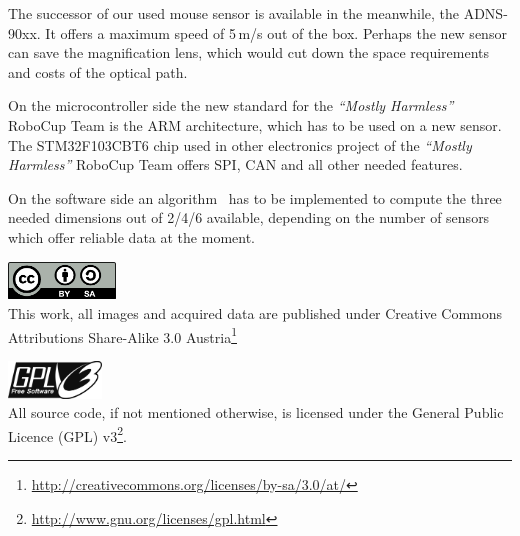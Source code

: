 \documentclass[12pt,a4paper]{article}
\newcommand{\MH}{\emph{``Mostly Harmless''} RoboCup Team\xspace}
\begin{document}
The successor of our used mouse sensor is available in the meanwhile, the ADNS-90xx.
It offers a maximum speed of 5\,m/s out of the box.
Perhaps the new sensor can save the magnification lens, which would cut down the space requirements and costs of the optical path.

On the microcontroller side the new standard for the \MH is the ARM architecture, which has to be used on a new sensor.
The STM32F103CBT6 chip used in other electronics project of the \MH offers SPI, CAN and all other needed features.

On the software side an algorithm~\cite{two_mice} has to be implemented to compute the three needed dimensions out of 2/4/6 available, depending on the number of sensors which offer reliable data at the moment.

\clearpage
{}

\includegraphics[height=1cm]{figures/by-sa}\\
This work, all images and acquired data are published under Creative Commons Attributions Share-Alike 3.0 Austria\footnote{\url{http://creativecommons.org/licenses/by-sa/3.0/at/}}

\vspace*{2.0cm}

\includegraphics[height=1cm]{figures/gpl-v3-logo}\\
All source code, if not mentioned otherwise, is licensed under the General Public Licence (GPL) v3\footnote{\url{http://www.gnu.org/licenses/gpl.html}}.

\clearpage
{}
\label{Bibliography}


%
\end{document}
